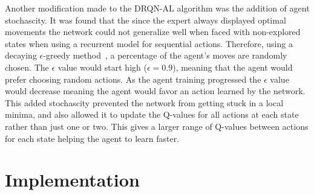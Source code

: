 \documentclass[12pt,american]{report}
\providecommand{\DIFaddtex}[1]{{\protect\color{blue}\uwave{#1}}} %
\providecommand{\DIFaddbegin}{} %
\providecommand{\DIFaddend}{} %
\providecommand{\DIFadd}[1]{\texorpdfstring{\DIFaddtex{#1}}{#1}} %
\newcommand{\DIFaddincludegraphics}[2][]{{\color{blue}\fbox{\DIFOincludegraphics[#1]{#2}}}} %
\DeclareRobustCommand{\DIFaddbegin}{\DIFOaddbegin \let\includegraphics\DIFaddincludegraphics} %
\DeclareRobustCommand{\DIFaddend}{\DIFOaddend \let\includegraphics\DIFOincludegraphics} %
\begin{document}
Another modification made to the DRQN-AL algorithm was the addition of agent stochascity.  It was found that the since the expert always displayed optimal movements the network could not generalize well when faced with non-explored states when using a recurrent model for sequential actions.  Therefore, using a decaying $\epsilon$-greedy method~\cite{Eden}, a percentage of the agent's moves are randomly chosen.  The $\epsilon$ value would start high ($\epsilon=0.9$), meaning that the agent would prefer choosing random actions.  As the agent training progressed the $\epsilon$ value would decrease meaning the agent would favor an action learned by the network. This added stochascity \DIFaddbegin \DIFadd{which }\DIFaddend prevented the network from getting stuck in a local minima, and also allowed it to update the Q-values for all actions at each state rather than just one or two.  This gives a larger range of Q-values between actions for each state helping the agent to learn faster.

\chapter{Implementation}
\label{sec:implementation}
\end{document}
